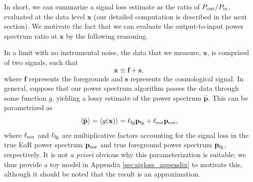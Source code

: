 \documentclass[preprint2,numberedappendix,tighten]{aastex6}  %
\newcommand{\x}{\mathbf{x}}
\newcommand{\f}{\mathbf{f}}
\newcommand{\s}{\mathbf{s}}
\newcommand{\p}{\mathbf{p}}
\newcommand{\phat}{\hat{\mathbf{p}}}
\begin{document}
In short, we can summarize a signal loss estimate as the ratio of $P_{\rm out}/P_{\rm in}$, evaluated at the data level $\textbf{x}$ (our detailed computation is described in the next section). We motivate the fact that we can evaluate the output-to-input power spectrum ratio at $\textbf{x}$ by the following reasoning.

In a limit with no instrumental noise, the data that we measure, $\x$, is comprised of two signals, such that
\begin{equation}
\x \equiv \f + \s,
\end{equation}
where $\mathbf{f}$ represents the foregrounds and $\mathbf{s}$ represents the cosmological signal. In general, suppose that our power spectrum algorithm passes the data through some function $g$, yielding a lossy estimate of the power spectrum $\phat$. This can be parametrized as
\begin{equation}
\label{eq:LinearPspecSum}
\langle \phat \rangle  = \langle g(\x) \rangle = \ell_{\rm fg} \p_{\rm fg} + \ell_{\rm eor} \p_{\rm eor},
\end{equation}
where $\ell_{\rm eor}$ and $\ell_{\rm fg}$ are multiplicative factors accounting for the signal loss in the true EoR power spectrum $\p_{\rm eor}$ and true foreground power spectrum $\p_{\rm fg}$, respectively. It is not \emph{a priori} obvious why this parameterization is suitable; we thus provide a toy model in Appendix \ref{sec:sigloss_appendix} to motivate this, although it should be noted that the result is an approximation.
\end{document}
